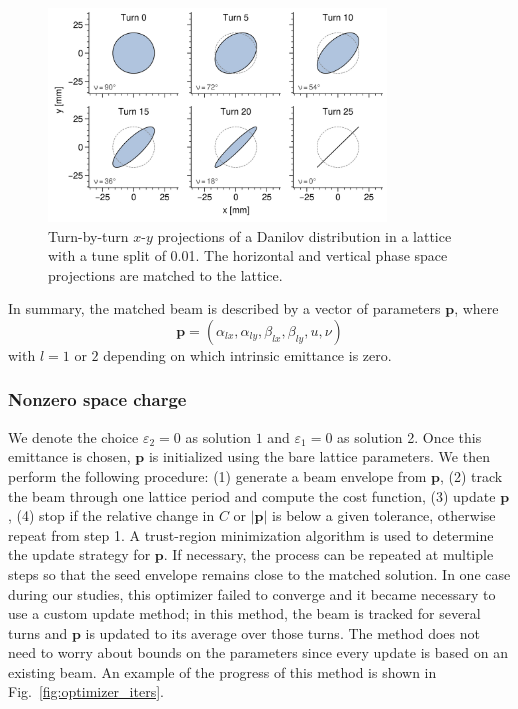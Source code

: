 %
\begin{figure}[!p]
    \centering
    \vspace*{2cm}
    \includegraphics[width=0.8\textwidth]{Images/chapter2/splittunes_tbt.png}
    \caption{Turn-by-turn $x$-$y$ projections of a Danilov distribution in a lattice with a tune split of 0.01. The horizontal and vertical phase space projections are matched to the lattice.}
    \label{fig:splittunes_tbt}
    \vspace*{2cm}
\end{figure}
%
In summary, the matched beam is described by a vector of parameters $\mathbf{p}$, where
%
\begin{equation} \label{eq:twiss_params_4D}
    \mathbf{p} = (\alpha_{lx}, \alpha_{ly}, \beta_{lx}, \beta_{ly}, u, \nu)
\end{equation}
%
with $l = 1$ or $2$ depending on which intrinsic emittance is zero.



\subsubsection{Nonzero space charge}

We denote the choice $\varepsilon_2 = 0$ as solution $1$ and $\varepsilon_1 = 0$ as solution 2. Once this emittance is chosen, $\mathbf{p}$ is initialized using the bare lattice parameters. We then perform the following procedure: (1) generate a beam envelope from $\mathbf{p}$, (2) track the beam through one lattice period and compute the cost function, (3) update $\mathbf{p}$, (4) stop if the relative change in $C$ or $|\mathbf{p}|$ is below a given tolerance, otherwise repeat from step 1. A trust-region minimization algorithm \cite{Branch1999} is used to determine the update strategy for $\mathbf{p}$. If necessary, the process can be repeated at multiple steps so that the seed envelope remains close to the matched solution. In one case during our studies, this optimizer failed to converge and it became necessary to use a custom update method; in this method, the beam is tracked for several turns and $\mathbf{p}$ is updated to its average over those turns. The method does not need to worry about bounds on the parameters since every update is based on an existing beam. An example of the progress of this method is shown in Fig.~\ref{fig:optimizer_iters}. 

